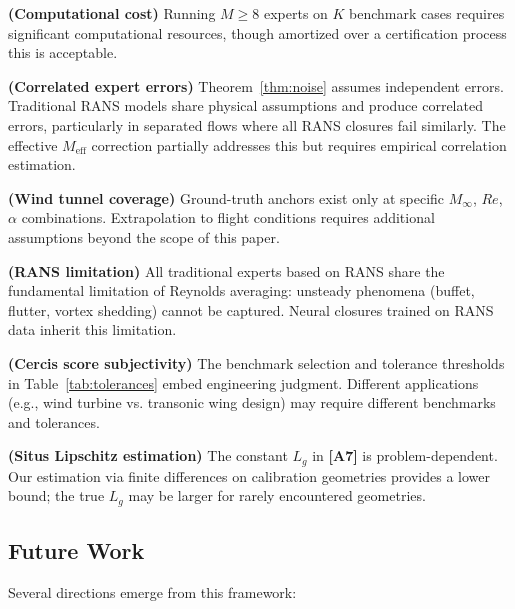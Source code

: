 \documentclass[11pt,a4paper]{article}
\theoremstyle{definition}
\theoremstyle{remark}
\newcommand{\assumptionTag}[1]{\textsf{\textbf{[A#1]}}}
\newcommand{\limitationTag}[1]{\textsf{\textbf{[L#1]}}}
\begin{document}
\begin{enumerate}[label=\limitationTag{\arabic*}, leftmargin=*, resume]
    \item \textbf{(Computational cost)} Running $M \geq 8$ experts on $K$ benchmark cases requires significant computational resources, though amortized over a certification process this is acceptable.
    \item \textbf{(Correlated expert errors)} Theorem~\ref{thm:noise} assumes independent errors. Traditional RANS models share physical assumptions and produce correlated errors, particularly in separated flows where all RANS closures fail similarly. The effective $M_{\text{eff}}$ correction partially addresses this but requires empirical correlation estimation.
    \item \textbf{(Wind tunnel coverage)} Ground-truth anchors exist only at specific $M_\infty$, $Re$, $\alpha$ combinations. Extrapolation to flight conditions requires additional assumptions beyond the scope of this paper.
    \item \textbf{(RANS limitation)} All traditional experts based on RANS share the fundamental limitation of Reynolds averaging: unsteady phenomena (buffet, flutter, vortex shedding) cannot be captured. Neural closures trained on RANS data inherit this limitation.
    \item \textbf{(Cercis score subjectivity)} The benchmark selection and tolerance thresholds in Table~\ref{tab:tolerances} embed engineering judgment. Different applications (e.g., wind turbine vs. transonic wing design) may require different benchmarks and tolerances.
    \item \textbf{(Situs Lipschitz estimation)} The constant $L_g$ in \assumptionTag{7} is problem-dependent. Our estimation via finite differences on calibration geometries provides a lower bound; the true $L_g$ may be larger for rarely encountered geometries.
\end{enumerate}

\subsection{Future Work}

Several directions emerge from this framework:
\end{document}
